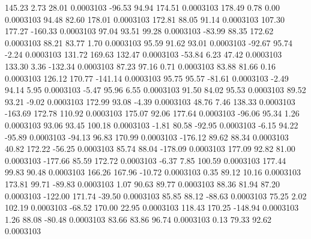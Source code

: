       145.23        2.73       28.01     0.0003103
      -96.53       94.94      174.51     0.0003103
      178.49        0.78        0.00     0.0003103
       94.48       82.60      178.01     0.0003103
      172.81       88.05       91.14     0.0003103
      107.30      177.27     -160.33     0.0003103
       97.04       93.51       99.28     0.0003103
      -83.99       88.35      172.62     0.0003103
       88.21       83.77        1.70     0.0003103
       95.59       91.62       93.01     0.0003103
      -92.67       95.74       -2.24     0.0003103
      131.72      169.63      132.47     0.0003103
      -53.84        6.23       47.42     0.0003103
      133.30        3.36     -132.34     0.0003103
       87.23       97.16        0.71     0.0003103
       83.88       81.66        0.16     0.0003103
      126.12      170.77     -141.14     0.0003103
       95.75       95.57      -81.61     0.0003103
       -2.49       94.14        5.95     0.0003103
       -5.47       95.96        6.55     0.0003103
       91.50       84.02       95.53     0.0003103
       89.52       93.21       -9.02     0.0003103
      172.99       93.08       -4.39     0.0003103
       48.76        7.46      138.33     0.0003103
     -163.69      172.78      110.92     0.0003103
      175.07       92.06      177.64     0.0003103
      -96.06       95.34        1.26     0.0003103
       93.06       93.45      100.18     0.0003103
       -1.81       80.58      -92.95     0.0003103
       -6.15       94.22      -95.89     0.0003103
      -94.13       96.83      170.99     0.0003103
     -176.12       89.62       88.34     0.0003103
       40.82      172.22      -56.25     0.0003103
       85.74       88.04     -178.09     0.0003103
      177.09       92.82       81.00     0.0003103
     -177.66       85.59      172.72     0.0003103
       -6.37        7.85      100.59     0.0003103
      177.44       99.83       90.48     0.0003103
      166.26      167.96      -10.72     0.0003103
        0.35       89.12       10.16     0.0003103
      173.81       99.71      -89.83     0.0003103
        1.07       90.63       89.77     0.0003103
       88.36       81.94       87.20     0.0003103
     -122.00      171.74      -39.50     0.0003103
       85.85       88.12      -88.63     0.0003103
       75.25        2.02      102.19     0.0003103
      -68.52      170.00       22.95     0.0003103
      118.43      170.25     -148.94     0.0003103
        1.26       88.08      -80.48     0.0003103
       83.66       83.86       96.74     0.0003103
        0.13       79.33       92.62     0.0003103
